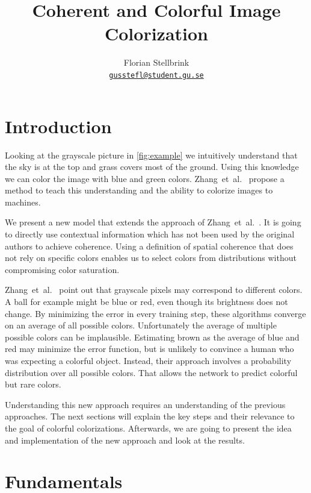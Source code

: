 \documentclass[11pt]{article}
\begin{document}
\title{Coherent and Colorful Image Colorization}
\author{Florian Stellbrink\\\texttt{\href{mailto:gusstefl@student.gu.se}{gusstefl@student.gu.se}}}
\maketitle

\section{Introduction}
Looking at the grayscale picture in \autoref{fig:example} we intuitively understand that the sky is at the top and grass covers most of the ground. Using this knowledge we can color the image with blue and green colors.
Zhang~et~al.~\cite{zhang2016colorful} propose a method to teach this understanding and the ability to colorize images to machines. 

We present a new model that extends the approach of Zhang~et~al.~\cite{zhang2016colorful}. It is going to directly use contextual information which has not been used by the original authors to achieve coherence. Using a definition of spatial coherence that does not rely on specific colors enables us to select colors from distributions without compromising color saturation.

Zhang~et~al.~\cite{zhang2016colorful} point out that grayscale pixels may correspond to different colors. A ball for example might be blue or red, even though its brightness does not change. By minimizing the error in every training step, these algorithms converge on an average of all possible colors. Unfortunately the average of multiple possible colors can be implausible. Estimating brown as the average of blue and red may minimize the error function, but is unlikely to convince a human who was expecting a colorful object.
Instead, their approach involves a probability distribution over all possible colors. That allows the network to predict colorful but rare colors.

Understanding this new approach requires an understanding of the previous approaches. The next sections will explain the key steps and their relevance to the goal of colorful colorizations. Afterwards, we are going to present the idea and implementation of the new approach and look at the results.

\section{Fundamentals}
\end{document}
